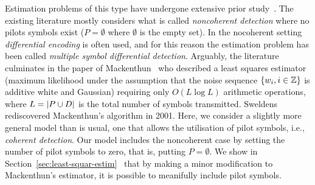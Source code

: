 \documentclass[journal]{IEEEtran}
\begin{document}
Estimation problems of this type have undergone extensive prior study~\cite{Wilson1989,Makrakis1990,Liu1991,Mackenthun1994,Sweldens2001}.  The existing literature mostly considers what is called \emph{noncoherent detection} where no pilots symbols exist ($P = \emptyset$ where $\emptyset$ is the empty set).  In the nocoherent setting \emph{differential encoding} is often used, and for this reason the estimation problem has been called \emph{multiple symbol differential detection}.  Arguably, the literature culminates in the paper of Mackenthun~\cite{Mackenthun1994} who described a least squares estimator (maximum likelihood under the assumption that the noise sequence $\{w_i, i \in {\mathbb Z}\}$ is additive white and Gaussian) requiring only $O(L \log L)$ arithmetic operations, where $L = {\left| P \cup D \right|}$ is the total number of symbols transmitted.  Sweldens~\cite{Sweldens2001} rediscovered Mackenthun's algorithm in 2001.  Here, we consider a slightly more general model than is usual, one that allows the utilisation of pilot symbols, i.e., \emph{coherent detection}.  Our model includes the noncoherent case by setting the number of pilot symbols to zero, that is, putting $P = \emptyset$.  We show in Section~\ref{sec:least-squar-estim}~ that by making a minor modification to Mackenthun's estimator, it is possible to meanifully include pilot symbols.
\end{document}
